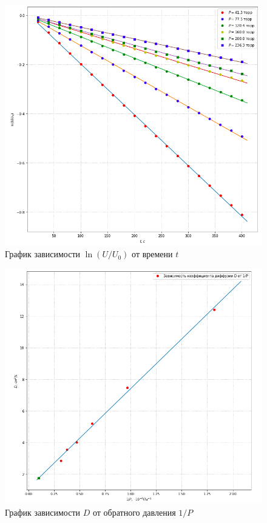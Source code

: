 \documentclass[a4paper,12pt]{article}
\begin{document}
\begin{figure}[h!]
	\centering 
	\includegraphics[scale=0.5]{g1.jpg} 
	\caption{График зависимости  $\ln (U / U_0)$ от времени $t$ } 
\end{figure}



\begin{figure}[h!]
	\centering 
	\includegraphics[scale=0.5]{g3.jpg} 
	\caption{График зависимости  $D$ от обратного давления $1/P$ } 
\end{figure}
\end{document}
